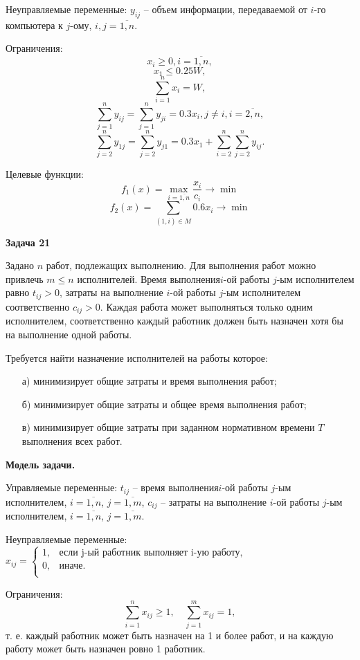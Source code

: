 \documentclass[a4paper,14pt]{extreport}
\begin{document}
Неуправляемые переменные: $y_{ij}$ -- объем информации, передаваемой от $i$-го компьютера к $j$-ому, $i, j = \overline{1, n}$.
\newline

Ограничения:
$$
	x_i \ge 0, i =\overline{1, n},
$$ $$
	x_1 \le 0.25 W,
$$ $$
	\sum_{i=1}^n x_i = W,
$$ $$
	\sum_{j=1}^n y_{ij} = \sum_{j=1}^n y_{ji} = 0.3x_i, j \ne i, i = \overline{2, n},
$$ $$
	\sum_{j=2}^n y_{1j} = \sum_{j=2}^n y_{j1} = 0.3 x_1 + \sum_{i=2}^n \sum_{j=2}^n y_{ij}.
$$

Целевые функции:
$$
	f_1(x) = \max_{i=\overline{1,n}} \frac{x_i}{c_i} \to \min
$$ $$
	f_2(x) = \sum_{(1, i) \in M} 0.6x_i \to \min
$$

\textbf{Задача 21}

Задано $n$ работ, подлежащих выполнению. Для выполнения работ можно привлечь $m \le n$ исполнителей. Время выполнения$i$-ой работы $j$-ым исполнителем равно $t_{ij} > 0$, затраты на выполнение $i$-ой работы $j$-ым исполнителем соответственно $c_{ij} > 0$. Каждая работа может выполняться только одним исполнителем, соответственно каждый работник должен быть назначен хотя бы на выполнение одной работы.

Требуется найти назначение исполнителей на работы которое:
\begin{itemize}
\item[а)] минимизирует общие затраты и время выполнения работ;
\item[б)] минимизирует общие затраты и общее время выполнения работ;
\item[в)] минимизирует общие затраты при заданном нормативном времени $T$ выполнения всех работ.
\end{itemize}

\textbf{Модель задачи.} 

Управляемые переменные: $t_{ij}$ -- время выполнения$i$-ой работы $j$-ым исполнителем, $i = \overline{1, n}$, $j = \overline{1, m}$, $c_{ij}$ -- затраты на выполнение $i$-ой работы $j$-ым исполнителем, $i = \overline{1, n}$, $j = \overline{1, m}$.

Неуправляемые переменные: 
\newline
$x_{ij} = \begin{cases}
	1, & \text{если j-ый работник выполняет i-ую работу,}\\
	0, & \text{иначе.}\\
\end{cases}$
\newline

Ограничения:
$$
	\sum_{i=1}^n x_{ij} \ge 1, \quad \sum_{j=1}^m x_{ij} = 1,
$$
т. е. каждый работник может быть назначен на 1 и более работ, и на каждую работу может быть назначен ровно 1 работник.
\newline
\end{document}
